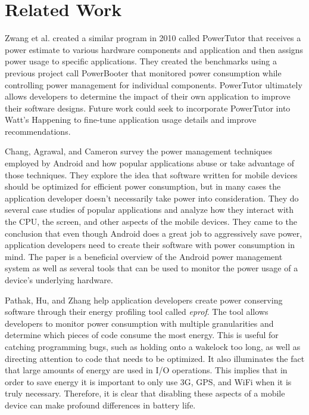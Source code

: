 \section*{Related Work}
Zwang et al.\cite{Zhang:2010:AOP:1878961.1878982} created a similar program in 2010 called PowerTutor that receives a power estimate to various hardware components and application and then assigns power usage to specific applications.  
They created the benchmarks using a previous project call PowerBooter that monitored power consumption while controlling power management for individual components.  
PowerTutor ultimately allows developers to determine the impact of their own application to improve their software designs.  
Future work could seek to incorporate PowerTutor into Watt's Happening to fine-tune application usage details and improve recommendations.

Chang, Agrawal, and Cameron survey the power management techniques employed by Android and how popular applications abuse or take advantage of those techniques\cite{energy-aware}. 
They explore the idea that software written for mobile devices should be optimized for efficient power consumption, but in many cases the application developer doesn't necessarily take power into consideration. 
They do several case studies of popular applications and analyze how they interact with the CPU, the screen, and other aspects of the mobile devices. 
They came to the conclusion that even though Android does a great job to aggressively save power, application developers need to create their software with power consumption in mind. 
The paper is a beneficial overview of the Android power management system as well as several tools that can be used to monitor the power usage of a device's underlying hardware. 

Pathak, Hu, and Zhang help application developers create power conserving software through their energy profiling tool called \emph{eprof}\cite{Pathak:2012:ESI:2168836.2168841}. 
The tool allows developers to monitor power consumption with multiple granularities and determine which pieces of code consume the most energy. 
This is useful for catching programming bugs, such as holding onto a wakelock too long, as well as directing attention to code that needs to be optimized. 
It also illuminates the fact that large amounts of energy are used in I/O operations. 
This implies that in order to save energy it is important to only use 3G, GPS, and WiFi when it is truly necessary. 
Therefore, it is clear that disabling these aspects of a mobile device can make profound differences in battery life.

